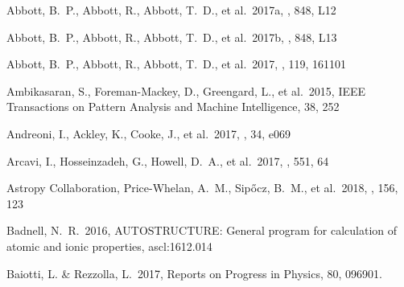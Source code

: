 \documentclass[twocolumn, twocolappendix]{aastex63}
\begin{document}

\begin{thebibliography}{}




 Abbott, B.~P., Abbott, R., Abbott, T.~D., et al.\ 2017a, \aj, 848, L12


 Abbott, B.~P., Abbott, R., Abbott, T.~D., et al.\ 2017b, \apjl, 848, L13


 Abbott, B.~P., Abbott, R., Abbott, T.~D., et al.\ 2017, \prl, 119, 161101





 Ambikasaran, S., Foreman-Mackey, D., Greengard, L., et al.\ 2015, IEEE Transactions on Pattern Analysis and Machine Intelligence, 38, 252


 Andreoni, I., Ackley, K., Cooke, J., et al.\ 2017, \pasa, 34, e069


 Arcavi, I., Hosseinzadeh, G., Howell, D.~A., et al.\ 2017, \nat, 551, 64




 Astropy Collaboration, Price-Whelan, A.~M., Sip{\H{o}}cz, B.~M., et al.\ 2018, \aj, 156, 123


 Badnell, N.~R.\ 2016, AUTOSTRUCTURE: General program for calculation of atomic and ionic properties, ascl:1612.014


 Baiotti, L. \& Rezzolla, L.\ 2017, Reports on Progress in Physics, 80, 096901.





\end{thebibliography}
\end{document}
